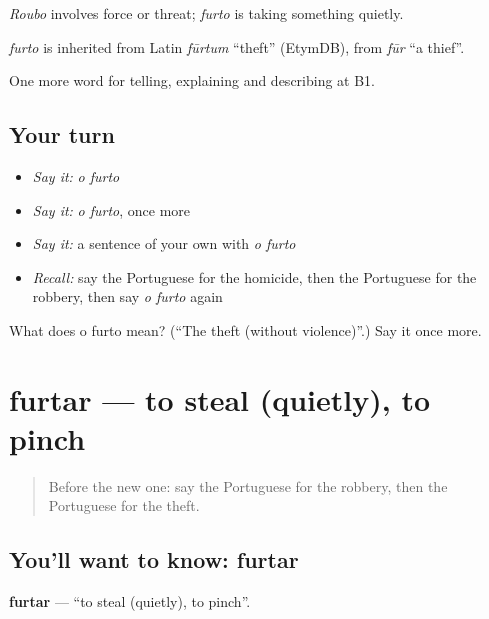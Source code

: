 \emph{Roubo} involves force or threat; \emph{furto} is taking something quietly.

\begin{cousinweb}
\emph{furto} is inherited from Latin \emph{fūrtum} \textquotedblleft{}theft\textquotedblright{} (EtymDB), from \emph{fūr} \textquotedblleft{}a thief\textquotedblright{}.
\end{cousinweb}

\begin{grammarlens}[title={What you've built}]
One more word for telling, explaining and describing at B1.
\end{grammarlens}

\subsection*{Your turn}
\begin{itemize}
\raggedright
  \item \emph{Say it:} \emph{o furto}
  \item \emph{Say it:} \emph{o furto}, once more
  \item \emph{Say it:} a sentence of your own with \emph{o furto}
  \item \emph{Recall:} say the Portuguese for the homicide, then the Portuguese for the robbery, then say \emph{o furto} again
\end{itemize}

\begin{tcolorbox}[breakable,colback=teal!4,colframe=teal!35!black,title={Before you move on}]
What does o furto mean? (\textquotedblleft{}The theft (without violence)\textquotedblright{}.) Say it once more.
\end{tcolorbox}
\section[furtar]{furtar — to steal (quietly), to pinch}

\label{lesson:PT-C287-furtar}



\begin{quote}
Before the new one: say the Portuguese for the robbery, then the Portuguese for the theft.
\end{quote}

\subsection*{You'll want to know: furtar}
\textbf{furtar} — \textquotedblleft{}to steal (quietly), to pinch\textquotedblright{}.

